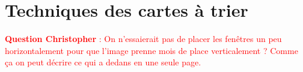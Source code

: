 \documentclass{article}[12pt]
\begin{document}
\section{Techniques des cartes à trier}
\begin{figure}[H]
	\centering   {}
\end{figure}
\textcolor{red}{\textbf{Question Christopher} : On n'essaierait pas de placer les fenêtres un peu horizontalement pour que l'image prenne mois de place verticalement ? Comme ça on peut décrire ce qui a dedans en une seule page.}
\end{document}
